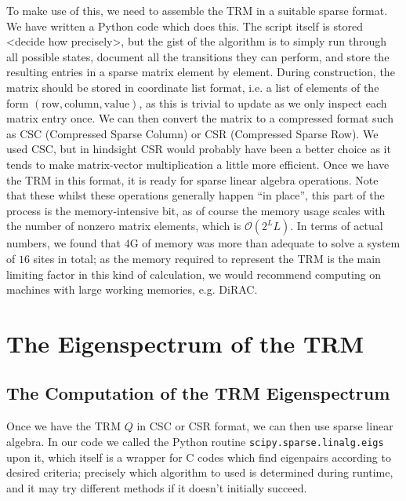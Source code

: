 To make use of this, we need to assemble the TRM in a suitable sparse format.
We have written a Python code which does this. The script itself is stored <decide how 
precisely>, but the gist of the algorithm is to simply run through all possible states,
document all the transitions they can perform, and store the resulting entries in
a sparse matrix element by element. During construction, the matrix should be stored in
coordinate list format, i.e. a list of elements of the form $(\mathrm{row}, 
\mathrm{column}, \mathrm{value})$, as this is trivial to update as we only inspect
each matrix entry once. We can then convert the matrix to a compressed format such
as CSC (Compressed Sparse Column) or CSR (Compressed Sparse Row). We used CSC, but in
hindsight CSR would probably have been a better choice as it tends to make
matrix-vector multiplication a little more efficient. Once we have the TRM in this
format, it is ready for sparse linear algebra operations. Note that these whilst
these operations generally happen ``in place'', this part of the process is the
memory-intensive bit, as of course the memory usage scales with the number of nonzero
matrix elements, which is $\mathcal{O}(2^{L}L)$.
In terms of actual numbers, we found
that 4G of memory was more than adequate to solve a system of $16$ sites in total;
as the memory required to represent the TRM is the main limiting factor in this kind of
calculation, we would recommend computing on machines with large working memories,
e.g. DiRAC.

\section{The Eigenspectrum of the TRM}

\subsection{The Computation of the TRM Eigenspectrum} \label{sec:eigenFind}
Once we have the TRM $Q$ in CSC or CSR format, we can then use sparse linear algebra. 
In our code we called the Python routine \texttt{scipy.sparse.linalg.eigs} upon it,
which itself is a wrapper for C codes which find eigenpairs according to desired
criteria; precisely which algorithm to used is determined during runtime, and it may
try different methods if it doesn't initially succeed.

